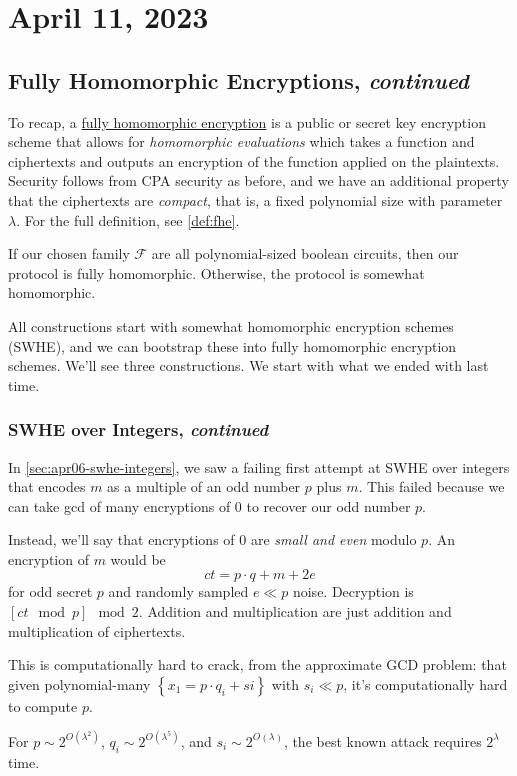 \section{April 11, 2023}
\label{20230411}
\subsection{Fully Homomorphic Encryptions, \emph{continued}}
To recap, a \ul{fully homomorphic encryption} is a public or secret key encryption scheme that allows for \emph{homomorphic evaluations} which takes a function and ciphertexts and outputs an encryption of the function applied on the plaintexts. Security follows from CPA security as before, and we have an additional property that the ciphertexts are \emph{compact}, that is, a fixed polynomial size with parameter $\lambda$. For the full definition, see \cref{def:fhe}.

If our chosen family $\mathcal{F}$ are all polynomial-sized boolean circuits, then our protocol is fully homomorphic. Otherwise, the protocol is somewhat homomorphic.

All constructions start with somewhat homomorphic encryption schemes (SWHE), and we can bootstrap these into fully homomorphic encryption schemes. We'll see three constructions. We start with what we ended with last time.

\subsubsection{SWHE over Integers, \emph{continued}}
In \cref{sec:apr06-swhe-integers}, we saw a failing first attempt at SWHE over integers that encodes $m$ as a multiple of an odd number $p$ plus $m$. This failed because we can take gcd of many encryptions of $0$ to recover our odd number $p$.

Instead, we'll say that encryptions of $0$ are \emph{small and even} modulo $p$. An encryption of $m$ would be
\[ct = p\cdot q + m + 2e\]
for odd secret $p$ and randomly sampled $e\ll p$ noise. Decryption is $\left[ ct\mod p \right]\mod 2$. Addition and multiplication are just addition and multiplication of ciphertexts.

This is computationally hard to crack, from the approximate GCD problem: that given polynomial-many $\left\{ x_1 = p\cdot q_i + si \right\}$ with $s_i \ll p$, it's computationally hard to compute $p$.

For $p\sim 2^{O(\lambda^2)}$, $q_i\sim 2^{O(\lambda^5)}$, and $s_i\sim 2^{O(\lambda)}$, the best known attack requires $2^\lambda$ time.

